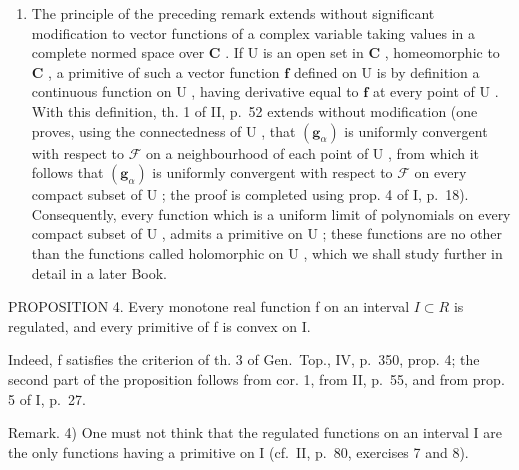 \begin{enumerate}
\def\labelenumi{\arabic{enumi})}
\setcounter{enumi}{2}
\tightlist
\item
  The principle of the preceding remark extends without significant modification to vector functions of a complex variable taking values in a complete normed space over \(\mathbf{C}\) . If \(\mathrm{U}\) is an open set in \(\mathbf{C}\) , homeomorphic to \(\mathbf{C}\) , a primitive of such a vector function \(\mathbf{f}\) defined on \(\mathrm{U}\) is by definition a continuous function on \(\mathrm{U}\) , having derivative equal to \(\mathbf{f}\) at every point of \(\mathrm{U}\) . With this definition, th. 1 of II, p.~52 extends without modification (one proves, using the connectedness of \(\mathrm{U}\) , that \((\mathbf{g}_{\alpha})\) is uniformly convergent with respect to \(\mathcal{F}\) on a neighbourhood of each point of \(\mathrm{U}\) , from which it follows that \((\mathbf{g}_{\alpha})\) is uniformly convergent with respect to \(\mathcal{F}\) on every compact subset of \(\mathrm{U}\) ; the proof is completed using prop. 4 of I, p.~18). Consequently, every function which is a uniform limit of polynomials on every compact subset of \(\mathrm{U}\) , admits a primitive on \(\mathrm{U}\) ; these functions are no other than the functions called holomorphic on \(\mathrm{U}\) , which we shall study further in detail in a later Book.
\end{enumerate}

PROPOSITION 4. Every monotone real function f on an interval \(I \subset R\) is regulated, and every primitive of f is convex on I.

Indeed, f satisfies the criterion of th. 3 of Gen.~Top., IV, p.~350, prop. 4; the second part of the proposition follows from cor. 1, from II, p.~55, and from prop. 5 of I, p.~27.

Remark. 4) One must not think that the regulated functions on an interval I are the only functions having a primitive on I (cf.~II, p.~80, exercises 7 and 8).

